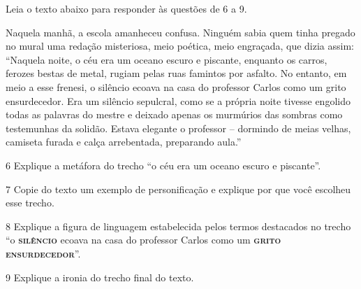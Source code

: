 
Leia o texto abaixo para responder às questões de 6 a 9.

\begin{myquote}

Naquela manhã, a escola amanheceu confusa. Ninguém sabia quem tinha pregado no
mural uma redação misteriosa, meio poética, meio engraçada, que dizia assim:
``Naquela noite, o céu era um oceano escuro e piscante, enquanto os carros, 
ferozes bestas de metal, rugiam pelas ruas famintos por asfalto. No entanto, 
em meio a esse frenesi, o silêncio ecoava na casa do professor Carlos como 
um grito ensurdecedor. Era um silêncio sepulcral, como se a própria noite 
tivesse engolido todas as palavras do mestre e deixado apenas os murmúrios 
das sombras como testemunhas da solidão. Estava elegante o professor -- 
dormindo de meias velhas, camiseta furada e calça arrebentada, preparando aula.''


\end{myquote}

\num{6} Explique a metáfora do trecho ``o céu era um oceano escuro e piscante''.


\num{7} Copie do texto um exemplo de personificação e explique por que você
escolheu esse trecho.


\num{8} Explique a figura de linguagem estabelecida pelos termos destacados no trecho 
``o \textsc{\textbf{silêncio}} ecoava na casa do professor Carlos como um 
\textsc{\textbf{grito ensurdecedor}}''.


\num{9} Explique a ironia do trecho final do texto.


